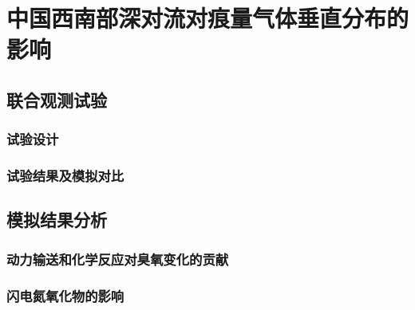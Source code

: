 \chapter{中国西南部深对流对痕量气体垂直分布的影响}

\section{联合观测试验}

\subsection{试验设计}
\subsection{试验结果及模拟对比}

\section{模拟结果分析}

\subsection{动力输送和化学反应对臭氧变化的贡献}
\subsection{闪电氮氧化物的影响}
